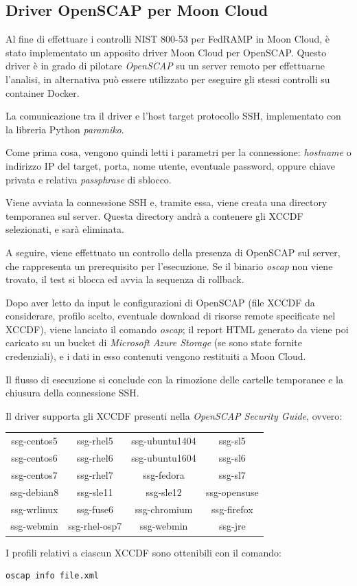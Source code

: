 \documentclass[../main.tex]{subfiles}
\begin{document}
\subsection{Driver OpenSCAP per Moon Cloud}
Al fine di effettuare i controlli NIST 800-53 per FedRAMP in Moon Cloud, è stato implementato un apposito driver Moon Cloud per OpenSCAP.
Questo driver è in grado di pilotare \textit{OpenSCAP} su un server remoto per effettuarne l'analisi, in alternativa può essere utilizzato per eseguire gli stessi controlli su container Docker.

La comunicazione tra il driver e l'host target protocollo SSH, implementato con la libreria Python \textit{paramiko}.

Come prima cosa, vengono quindi letti i parametri per la connessione: \textit{hostname} o indirizzo IP del target, porta, nome utente, eventuale password, oppure chiave privata e relativa \textit{passphrase} di sblocco.

Viene avviata la connessione SSH e, tramite essa, viene creata una directory temporanea sul server. Questa directory andrà a contenere gli XCCDF selezionati, e sarà eliminata.

A seguire, viene effettuato un controllo della presenza di OpenSCAP sul server, che rappresenta un prerequisito per l'esecuzione. Se il binario \textit{oscap} non viene trovato, il test si blocca ed avvia la sequenza di rollback.

Dopo aver letto da input le configurazioni di OpenSCAP (file XCCDF da considerare, profilo scelto, eventuale download di risorse remote specificate nel XCCDF), viene lanciato il comando \textit{oscap}; il report HTML generato da viene poi caricato su un bucket di \textit{Microsoft Azure Storage} (se sono state fornite credenziali), e i dati in esso contenuti vengono restituiti a Moon Cloud.

Il flusso di esecuzione si conclude con la rimozione delle cartelle temporanee e la chiusura della connessione SSH.

Il driver supporta gli XCCDF presenti nella \textit{OpenSCAP Security Guide}, ovvero:
\begin{table}[H]
    \begin{tabulary}{\textwidth}{cccc}

         
        ssg-centos5 & ssg-rhel5     & ssg-ubuntu1404 & ssg-sl5      \\
        ssg-centos6 & ssg-rhel6     & ssg-ubuntu1604 & ssg-sl6      \\
        ssg-centos7 & ssg-rhel7     & ssg-fedora     & ssg-sl7      \\
        ssg-debian8 & ssg-sle11     & ssg-sle12      & ssg-opensuse \\
        ssg-wrlinux & ssg-fuse6     & ssg-chromium   & ssg-firefox  \\
        ssg-webmin  & ssg-rhel-osp7 & ssg-webmin     & ssg-jre

    \end{tabulary}
\end{table}
I profili relativi a ciascun XCCDF sono ottenibili con il comando:
\begin{Verbatim}[frame=single]
oscap info file.xml
\end{Verbatim}
\end{document}
